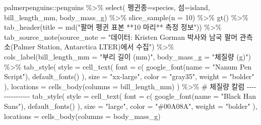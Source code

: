 \documentclass[
  letterpaper,
]{book}
\newenvironment{Shaded}{\begin{snugshade}}{\end{snugshade}}
\newcommand{\AttributeTok}[1]{\textcolor[rgb]{0.40,0.45,0.13}{#1}}
\newcommand{\CommentTok}[1]{\textcolor[rgb]{0.37,0.37,0.37}{#1}}
\newcommand{\DecValTok}[1]{\textcolor[rgb]{0.68,0.00,0.00}{#1}}
\newcommand{\FunctionTok}[1]{\textcolor[rgb]{0.28,0.35,0.67}{#1}}
\newcommand{\NormalTok}[1]{\textcolor[rgb]{0.00,0.23,0.31}{#1}}
\newcommand{\OtherTok}[1]{\textcolor[rgb]{0.00,0.23,0.31}{#1}}
\newcommand{\SpecialCharTok}[1]{\textcolor[rgb]{0.37,0.37,0.37}{#1}}
\newcommand{\StringTok}[1]{\textcolor[rgb]{0.13,0.47,0.30}{#1}}
\begin{document}
\begin{Shaded}
\begin{Highlighting}[]
\NormalTok{palmerpenguins}\SpecialCharTok{::}\NormalTok{penguins }\SpecialCharTok{\%\textgreater{}\%} 
  \FunctionTok{select}\NormalTok{( 펭귄종}\OtherTok{=}\NormalTok{species, 섬}\OtherTok{=}\NormalTok{island, bill\_length\_mm, body\_mass\_g) }\SpecialCharTok{\%\textgreater{}\%} 
  \FunctionTok{slice\_sample}\NormalTok{(}\AttributeTok{n =} \DecValTok{10}\NormalTok{) }\SpecialCharTok{\%\textgreater{}\%} 
  \FunctionTok{gt}\NormalTok{() }\SpecialCharTok{\%\textgreater{}\%} 
    \FunctionTok{tab\_header}\NormalTok{(}\AttributeTok{title =} \FunctionTok{md}\NormalTok{(}\StringTok{"팔머 펭귄 표본 **10 마리** 측정 정보"}\NormalTok{)) }\SpecialCharTok{\%\textgreater{}\%} 
    \FunctionTok{tab\_source\_note}\NormalTok{(}\AttributeTok{source\_note =} \StringTok{"데이터: Kristen Gorman 박사와 남국 팔머 관측소(Palmer Station, Antarctica LTER)에서 수집"}\NormalTok{) }\SpecialCharTok{\%\textgreater{}\%} 
    \FunctionTok{cols\_label}\NormalTok{(}\AttributeTok{bill\_length\_mm =} \StringTok{"부리 길이 (mm)"}\NormalTok{,}
               \AttributeTok{body\_mass\_g    =} \StringTok{"체질량 (g)"}\NormalTok{) }\SpecialCharTok{\%\textgreater{}\%} 
  \FunctionTok{tab\_style}\NormalTok{(}
    \AttributeTok{style =} \FunctionTok{cell\_text}\NormalTok{(}
      \AttributeTok{font =} \FunctionTok{c}\NormalTok{(}
        \FunctionTok{google\_font}\NormalTok{(}\AttributeTok{name =} \StringTok{"Nanum Pen Script"}\NormalTok{),}
        \FunctionTok{default\_fonts}\NormalTok{()}
\NormalTok{      ),}
      \AttributeTok{size =} \StringTok{"xx{-}large"}\NormalTok{,}
      \AttributeTok{color =} \StringTok{"gray35"}\NormalTok{,}
      \AttributeTok{weight =} \StringTok{"bolder"}
\NormalTok{    ),}
    \AttributeTok{locations =} \FunctionTok{cells\_body}\NormalTok{(}\AttributeTok{columns =}\NormalTok{ bill\_length\_mm)}
\NormalTok{  ) }\SpecialCharTok{\%\textgreater{}\%} 
  \CommentTok{\# 체질량 칼럼  {-}{-}{-}{-}{-}{-}{-}{-}{-}{-}{-}{-}{-}{-}{-}}
  \FunctionTok{tab\_style}\NormalTok{(}
    \AttributeTok{style =} \FunctionTok{cell\_text}\NormalTok{(}
      \AttributeTok{font =} \FunctionTok{c}\NormalTok{(}
        \FunctionTok{google\_font}\NormalTok{(}\AttributeTok{name =} \StringTok{"Black Han Sans"}\NormalTok{),}
        \FunctionTok{default\_fonts}\NormalTok{()}
\NormalTok{      ),}
      \AttributeTok{size =} \StringTok{"large"}\NormalTok{,}
      \AttributeTok{color =} \StringTok{"\#00A08A"}\NormalTok{,}
      \AttributeTok{weight =} \StringTok{"bolder"}
\NormalTok{    ),}
    \AttributeTok{locations =} \FunctionTok{cells\_body}\NormalTok{(}\AttributeTok{columns =}\NormalTok{ body\_mass\_g)}

\end{Highlighting}
\end{Shaded}
\end{document}
